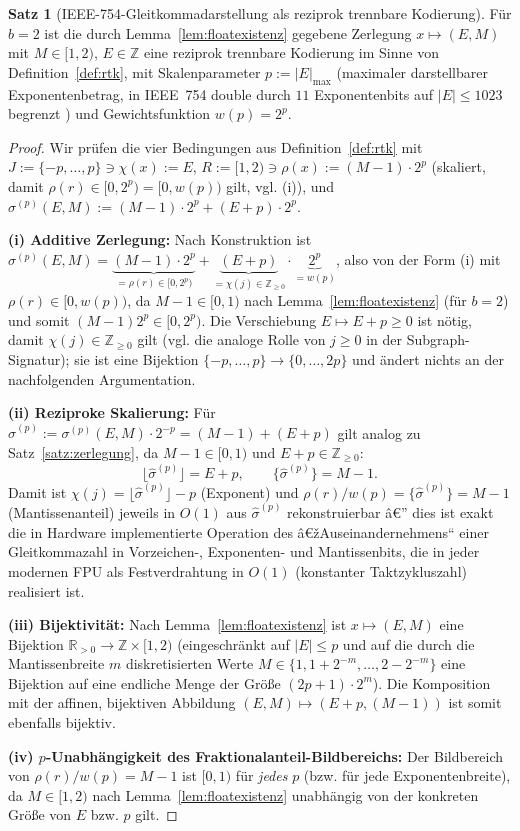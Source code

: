 ﻿\documentclass[a4paper,12pt]{article}
\theoremstyle{definition}
\newtheorem{satz}{Satz}
\begin{document}
\begin{satz}[IEEE-754-Gleitkommadarstellung als reziprok trennbare Kodierung]
\label{satz:ieee_rtk}
	Für $b=2$ ist die durch Lemma~\ref{lem:floatexistenz} gegebene
	Zerlegung $x\mapsto(E,M)$ mit $M\in[1,2)$, $E\in\mathbb{Z}$ eine
	reziprok trennbare Kodierung im Sinne von Definition~\ref{def:rtk},
	mit Skalenparameter $p:=|E|_{\max}$ (maximaler darstellbarer
	Exponentenbetrag, in IEEE~754 double durch $11$ Exponentenbits auf
	$|E|\leq1023$ begrenzt \cite{ieee754}) und Gewichtsfunktion
	$w(p)=2^{p}$.
\end{satz}

\begin{proof}
	Wir prüfen die vier Bedingungen aus Definition~\ref{def:rtk} mit
	$J:=\{-p,\ldots,p\}\ni\chi(x):=E$, $R:=[1,2)\ni\rho(x):=(M-1)\cdot 2^{p}$
	(skaliert, damit $\rho(r)\in[0,2^p)=[0,w(p))$ gilt, vgl. (i)), und
	$\sigma^{(p)}(E,M) := (M-1)\cdot2^p + (E+p)\cdot2^p$.

	\textbf{(i) Additive Zerlegung:} Nach Konstruktion ist
	$\sigma^{(p)}(E,M) = \underbrace{(M-1)\cdot2^p}_{=\rho(r)\in[0,2^p)}
	+ \underbrace{(E+p)}_{=\chi(j)\in\mathbb{Z}_{\geq0}}\cdot\underbrace{2^p}_{=w(p)}$,
	also von der Form (i) mit $\rho(r)\in[0,w(p))$, da $M-1\in[0,1)$ nach
	Lemma~\ref{lem:floatexistenz} (für $b=2$) und somit $(M-1)2^p\in[0,2^p)$.
	Die Verschiebung $E\mapsto E+p\geq0$ ist nötig, damit $\chi(j)\in\mathbb{Z}_{\geq0}$
	gilt (vgl. die analoge Rolle von $j\geq0$ in der Subgraph-Signatur);
	sie ist eine Bijektion $\{-p,\ldots,p\}\to\{0,\ldots,2p\}$ und ändert
	nichts an der nachfolgenden Argumentation.

	\textbf{(ii) Reziproke Skalierung:} Für
	$\hat\sigma^{(p)} := \sigma^{(p)}(E,M)\cdot 2^{-p}
	= (M-1) + (E+p)$ gilt analog zu Satz~\ref{satz:zerlegung}, da
	$M-1\in[0,1)$ und $E+p\in\mathbb{Z}_{\geq0}$:
	\[
		\lfloor\hat\sigma^{(p)}\rfloor = E+p, \qquad
		\{\hat\sigma^{(p)}\} = M-1.
	\]
	Damit ist $\chi(j)=\lfloor\hat\sigma^{(p)}\rfloor-p$ (Exponent) und
	$\rho(r)/w(p) = \{\hat\sigma^{(p)}\}=M-1$ (Mantissenanteil) jeweils in
	$O(1)$ aus $\hat\sigma^{(p)}$ rekonstruierbar â€” dies ist exakt die in
	Hardware implementierte Operation des â€žAuseinandernehmens`` einer
	Gleitkommazahl in Vorzeichen-, Exponenten- und Mantissenbits, die in
	jeder modernen FPU als Festverdrahtung in $O(1)$ (konstanter
	Taktzykluszahl) realisiert ist.

	\textbf{(iii) Bijektivität:} Nach Lemma~\ref{lem:floatexistenz} ist
	$x\mapsto(E,M)$ eine Bijektion $\mathbb{R}_{>0}\to\mathbb{Z}\times[1,2)$
	(eingeschränkt auf $|E|\leq p$ und auf die durch die Mantissenbreite
	$m$ diskretisierten Werte $M\in\{1,1+2^{-m},\ldots,2-2^{-m}\}$ eine
	Bijektion auf eine endliche Menge der Größe $(2p+1)\cdot2^m$). Die
	Komposition mit der affinen, bijektiven Abbildung
	$(E,M)\mapsto(E+p,(M-1))$ ist somit ebenfalls bijektiv.

	\textbf{(iv) $p$-Unabhängigkeit des Fraktionalanteil-Bildbereichs:}
	Der Bildbereich von $\rho(r)/w(p)=M-1$ ist $[0,1)$ für \emph{jedes}
	$p$ (bzw. für jede Exponentenbreite), da $M\in[1,2)$ nach
	Lemma~\ref{lem:floatexistenz} unabhängig von der konkreten Größe von
	$E$ bzw. $p$ gilt. \qedhere
\end{proof}
\end{document}
